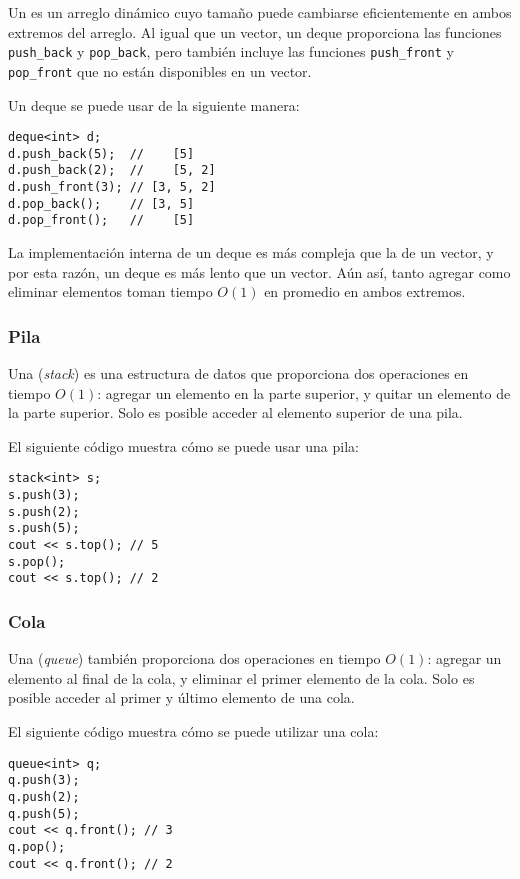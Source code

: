 
Un  es un arreglo dinámico
cuyo tamaño puede cambiarse eficientemente
en ambos extremos del arreglo.
Al igual que un vector, un deque proporciona las funciones
\texttt{push\_back} y \texttt{pop\_back}, pero
también incluye las funciones
\texttt{push\_front} y \texttt{pop\_front}
que no están disponibles en un vector.

Un deque se puede usar de la siguiente manera:
\begin{lstlisting}
deque<int> d;
d.push_back(5);  //    [5]
d.push_back(2);  //    [5, 2]
d.push_front(3); // [3, 5, 2]
d.pop_back();    // [3, 5]
d.pop_front();   //    [5]
\end{lstlisting}

La implementación interna de un deque
es más compleja que la de un vector,
y por esta razón, un deque es más lento que un vector.
Aún así, tanto agregar como eliminar
elementos toman tiempo $O(1)$ en promedio en ambos extremos.

\subsubsection{Pila}


Una  (\textit{stack})
es una estructura de datos que proporciona dos
operaciones en tiempo $O(1)$:
agregar un elemento en la parte superior,
y quitar un elemento de la parte superior.
Solo es posible acceder al elemento superior
de una pila.

El siguiente código muestra cómo se puede usar una pila:
\begin{lstlisting}
stack<int> s;
s.push(3);
s.push(2);
s.push(5);
cout << s.top(); // 5
s.pop();
cout << s.top(); // 2
\end{lstlisting}
\subsubsection{Cola}


Una  (\textit{queue}) también
proporciona dos operaciones en tiempo $O(1)$:
agregar un elemento al final de la cola,
y eliminar el primer elemento de la cola.
Solo es posible acceder al primer
y último elemento de una cola.

El siguiente código muestra cómo se puede utilizar una cola:
\begin{lstlisting}
queue<int> q;
q.push(3);
q.push(2);
q.push(5);
cout << q.front(); // 3
q.pop();
cout << q.front(); // 2
\end{lstlisting}

